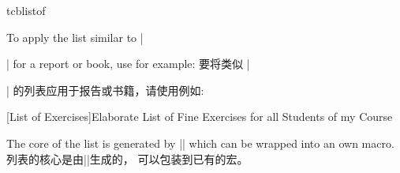 \begin{docCommand}[doc updated=2021-05-20]{tcblistof}{}
\medskip
\begin{stripedbox}
To apply the list similar to |\listoffigures| for a report or book, use for example:
\tcblower
要将类似 |\listoffigures| 的列表应用于报告或书籍，请使用例如:
\end{stripedbox}
\begin{dispListing}
\end{dispListing}

\medskip
{}
\begin{dispListing}
[List of Exercises]{Elaborate List of Fine Exercises
                                    for all Students of my Course}
\end{dispListing}

\medskip
\begin{marker}
\begin{stripedbox}
The core of the list is generated by |\@starttoc| which
can be wrapped into an own macro.
\tcblower
列表的核心是由|\@starttoc|生成的，%
可以包装到已有的宏。
\end{stripedbox}
\end{marker}
\end{docCommand}
